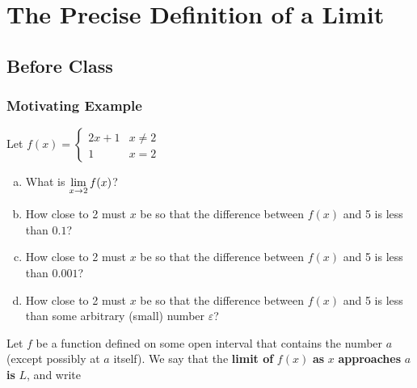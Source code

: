 \documentclass[notes]{subfiles}
\begin{document}
	\fancyhead[LO,RE]{\bfseries \currentname}
	\fancyfoot[C]{{}}
	\fancyfoot[RO,LE]{\large \thepage}	%
	
\section*{The Precise Definition of a Limit}\label{cs17}
	\subsection*{Before Class}
	\subsubsection*{Motivating Example}
		\begin{ex}
			Let $f(x) = \begin{cases}2x + 1 & x\neq 2 \\ 1 & x = 2 \end{cases}$
			\begin{enumerate}[(a)]
				\item What is $\displaystyle \lim_{x\to 2} f(x)$?
				\item How close to 2 must $x$ be so that the difference between $f(x)$ and 5 is less than $0.1$?
				\item How close to 2 must $x$ be so that the difference between $f(x)$ and 5 is less than $0.001$?
					\newpage
				\item How close to 2 must $x$ be so that the difference between $f(x)$ and 5 is less than some arbitrary (small) number $\varepsilon$?
			\end{enumerate}
		\end{ex}
		
		\begin{defn}
			Let $f$ be a function defined on some open interval that contains the number $a$ (except possibly at $a$ itself).  We say that the \textbf{limit of} $f(x)$ \textbf{as} $x$ \textbf{approaches} $a$ \textbf{is} $L$, and write
		\end{defn}
		
\end{document}
